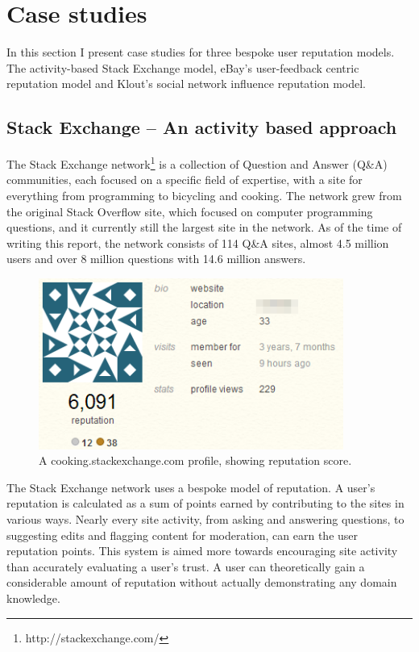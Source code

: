 \documentclass[]{final_report}
\begin{document}
\section{Case studies}

In this section I present case studies for three bespoke user reputation models. The activity-based Stack Exchange model, eBay's user-feedback centric reputation model and Klout's social network influence reputation model.

\subsection{Stack Exchange -- An activity based approach}

The Stack Exchange network\footnote{http://stackexchange.com/} is a collection of Question and Answer (Q\&A) communities, each focused on a specific field of expertise, with a site for everything from programming to bicycling and cooking. The network grew from the original Stack Overflow site, which focused on computer programming questions, and it currently still the largest site in the network. As of the time of writing this report, the network consists of 114 Q\&A sites, almost 4.5 million users and over 8 million questions with 14.6 million answers.

\begin{figure}[ht!]
\centering
\includegraphics[width=100mm]{serep.png}
\caption{A cooking.stackexchange.com profile, showing reputation score.}
\end{figure}


The Stack Exchange network uses a bespoke model of reputation. A user's reputation is calculated as a sum of points earned by contributing to the sites in various ways. Nearly every site activity, from asking and answering questions, to suggesting edits and flagging content for moderation, can earn the user reputation points. This system is aimed more towards encouraging site activity than accurately evaluating a user's trust. A user can theoretically gain a considerable amount of reputation without actually demonstrating any domain knowledge.
\end{document}
